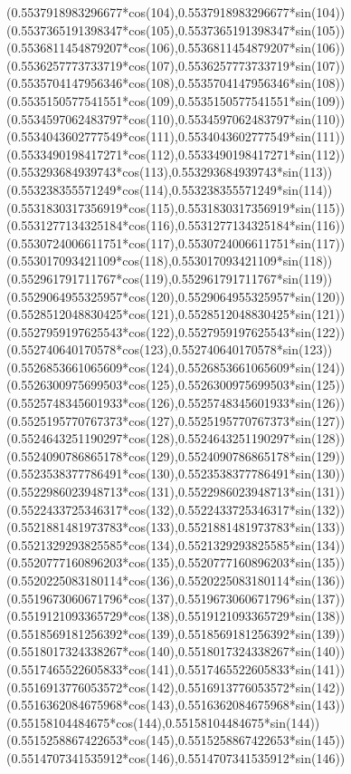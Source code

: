 {({0.5537918983296677*cos(104)},{0.5537918983296677*sin(104)})
({0.5537365191398347*cos(105)},{0.5537365191398347*sin(105)})
({0.5536811454879207*cos(106)},{0.5536811454879207*sin(106)})
({0.5536257773733719*cos(107)},{0.5536257773733719*sin(107)})
({0.5535704147956346*cos(108)},{0.5535704147956346*sin(108)})
({0.5535150577541551*cos(109)},{0.5535150577541551*sin(109)})
({0.5534597062483797*cos(110)},{0.5534597062483797*sin(110)})
({0.5534043602777549*cos(111)},{0.5534043602777549*sin(111)})
({0.5533490198417271*cos(112)},{0.5533490198417271*sin(112)})
({0.553293684939743*cos(113)},{0.553293684939743*sin(113)})
({0.553238355571249*cos(114)},{0.553238355571249*sin(114)})
({0.5531830317356919*cos(115)},{0.5531830317356919*sin(115)})
({0.5531277134325184*cos(116)},{0.5531277134325184*sin(116)})
({0.5530724006611751*cos(117)},{0.5530724006611751*sin(117)})
({0.553017093421109*cos(118)},{0.553017093421109*sin(118)})
({0.552961791711767*cos(119)},{0.552961791711767*sin(119)})
({0.5529064955325957*cos(120)},{0.5529064955325957*sin(120)})
({0.5528512048830425*cos(121)},{0.5528512048830425*sin(121)})
({0.5527959197625543*cos(122)},{0.5527959197625543*sin(122)})
({0.552740640170578*cos(123)},{0.552740640170578*sin(123)})
({0.5526853661065609*cos(124)},{0.5526853661065609*sin(124)})
({0.5526300975699503*cos(125)},{0.5526300975699503*sin(125)})
({0.5525748345601933*cos(126)},{0.5525748345601933*sin(126)})
({0.5525195770767373*cos(127)},{0.5525195770767373*sin(127)})
({0.5524643251190297*cos(128)},{0.5524643251190297*sin(128)})
({0.5524090786865178*cos(129)},{0.5524090786865178*sin(129)})
({0.5523538377786491*cos(130)},{0.5523538377786491*sin(130)})
({0.5522986023948713*cos(131)},{0.5522986023948713*sin(131)})
({0.5522433725346317*cos(132)},{0.5522433725346317*sin(132)})
({0.5521881481973783*cos(133)},{0.5521881481973783*sin(133)})
({0.5521329293825585*cos(134)},{0.5521329293825585*sin(134)})
({0.5520777160896203*cos(135)},{0.5520777160896203*sin(135)})
({0.5520225083180114*cos(136)},{0.5520225083180114*sin(136)})
({0.5519673060671796*cos(137)},{0.5519673060671796*sin(137)})
({0.5519121093365729*cos(138)},{0.5519121093365729*sin(138)})
({0.5518569181256392*cos(139)},{0.5518569181256392*sin(139)})
({0.5518017324338267*cos(140)},{0.5518017324338267*sin(140)})
({0.5517465522605833*cos(141)},{0.5517465522605833*sin(141)})
({0.5516913776053572*cos(142)},{0.5516913776053572*sin(142)})
({0.5516362084675968*cos(143)},{0.5516362084675968*sin(143)})
({0.55158104484675*cos(144)},{0.55158104484675*sin(144)})
({0.5515258867422653*cos(145)},{0.5515258867422653*sin(145)})
({0.5514707341535912*cos(146)},{0.5514707341535912*sin(146)})
}
